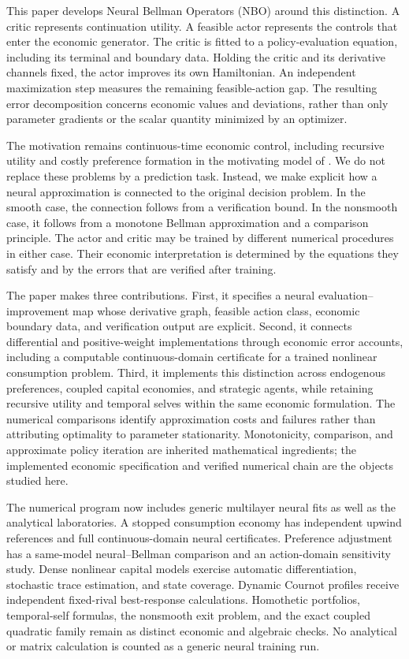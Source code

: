 \documentclass[ecta,draft]{econsocart}
\theoremstyle{definition}
\theoremstyle{remark}
\begin{document}
This paper develops Neural Bellman Operators (NBO) around this distinction. A critic represents continuation utility. A feasible actor represents the controls that enter the economic generator. The critic is fitted to a policy-evaluation equation, including its terminal and boundary data. Holding the critic and its derivative channels fixed, the actor improves its own Hamiltonian. An independent maximization step measures the remaining feasible-action gap. The resulting error decomposition concerns economic values and deviations, rather than only parameter gradients or the scalar quantity minimized by an optimizer.

The motivation remains continuous-time economic control, including recursive utility and costly preference formation in the motivating model of \citet{qi2025}. We do not replace these problems by a prediction task. Instead, we make explicit how a neural approximation is connected to the original decision problem. In the smooth case, the connection follows from a verification bound. In the nonsmooth case, it follows from a monotone Bellman approximation and a comparison principle. The actor and critic may be trained by different numerical procedures in either case. Their economic interpretation is determined by the equations they satisfy and by the errors that are verified after training.

The paper makes three contributions. First, it specifies a neural evaluation--improvement map whose derivative graph, feasible action class, economic boundary data, and verification output are explicit. Second, it connects differential and positive-weight implementations through economic error accounts, including a computable continuous-domain certificate for a trained nonlinear consumption problem. Third, it implements this distinction across endogenous preferences, coupled capital economies, and strategic agents, while retaining recursive utility and temporal selves within the same economic formulation. The numerical comparisons identify approximation costs and failures rather than attributing optimality to parameter stationarity. Monotonicity, comparison, and approximate policy iteration are inherited mathematical ingredients; the implemented economic specification and verified numerical chain are the objects studied here.

The numerical program now includes generic multilayer neural fits as well as the analytical laboratories. A stopped consumption economy has independent upwind references and full continuous-domain neural certificates. Preference adjustment has a same-model neural--Bellman comparison and an action-domain sensitivity study. Dense nonlinear capital models exercise automatic differentiation, stochastic trace estimation, and state coverage. Dynamic Cournot profiles receive independent fixed-rival best-response calculations. Homothetic portfolios, temporal-self formulas, the nonsmooth exit problem, and the exact coupled quadratic family remain as distinct economic and algebraic checks. No analytical or matrix calculation is counted as a generic neural training run.
\end{document}
